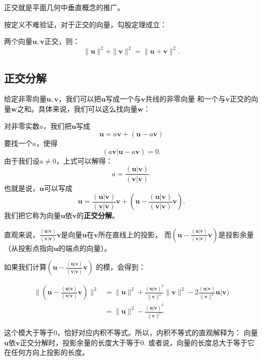 \documentclass[12pt,UTF8,fontset=none]{ctexbook}
\begin{document}
正交就是平面几何中垂直概念的推广。

按定义不难验证，对于正交的向量，勾股定理成立：
\begin{pp}\label{pp:7_2}
    两个向量$\mathbf{u}, \mathbf{v}$正交，则：
    $$ \|\mathbf{u}\|^2 + \|\mathbf{v}\|^2 = \|\mathbf{u} + \mathbf{v}\|^2.$$
\end{pp}

\subsection{正交分解}
给定非零向量$\mathbf{u}, \mathbf{v}$，我们可以把$\mathbf{u}$写成一个与$\mathbf{v}$共线的非零向量
和一个与$\mathbf{v}$正交的向量$\mathbf{w}$之和。具体来说，我们可以这么找向量$\mathbf{w}$：

对非零实数$a$，我们把$\mathbf{u}$写成
$$\mathbf{u} = a\mathbf{v} + (\mathbf{u} - a\mathbf{v}) $$
要找一个$a$，使得
$$ (a\mathbf{v} | \mathbf{u} - a\mathbf{v}) = 0.$$
由于我们设$a \neq 0$，上式可以解得：
$$ a = \frac{(\mathbf{u} | \mathbf{v})}{(\mathbf{v} | \mathbf{v})}.$$
也就是说，$\mathbf{u}$可以写成
$$\mathbf{u} = \frac{(\mathbf{u} | \mathbf{v})}{(\mathbf{v} | \mathbf{v})}\mathbf{v} + \left(\mathbf{u} - \frac{(\mathbf{u} | \mathbf{v})}{(\mathbf{v} | \mathbf{v})}\mathbf{v}\right). $$
我们把它称为向量$\mathbf{u}$依$\mathbf{v}$的\textbf{正交分解}。

直观来说，$\frac{(\mathbf{u} | \mathbf{v})}{(\mathbf{v} | \mathbf{v})}\mathbf{v}$是向量$\mathbf{u}$在$\mathbf{v}$所在直线上的投影，
而$\left(\mathbf{u} - \frac{(\mathbf{u} | \mathbf{v})}{(\mathbf{v} | \mathbf{v})}\mathbf{v}\right)$是投影余量（从投影点指向$\mathbf{u}$的端点的向量）。

如果我们计算$\left(\mathbf{u} - \frac{(\mathbf{u} | \mathbf{v})}{(\mathbf{v} | \mathbf{v})}\mathbf{v}\right)$ 的模，会得到：

\begin{align*}
    \|\left(\mathbf{u} - \frac{(\mathbf{u} | \mathbf{v})}{(\mathbf{v} | \mathbf{v})}\mathbf{v}\right)\|^2 &= 
    \|\mathbf{u}\|^2 + \frac{(\mathbf{u} | \mathbf{v})^2}{\|\mathbf{v} \|^4} \|\mathbf{v} \|^2 - 2 \frac{(\mathbf{u} | \mathbf{v})}{\|\mathbf{v} \|^2} \mathbf{u} | \mathbf{v})  \\
    &= \|\mathbf{u}\|^2 - \frac{(\mathbf{u} | \mathbf{v})^2}{\|\mathbf{v} \|^2}  
\end{align*}

这个模大于等于0，恰好对应内积不等式。所以，内积不等式的直观解释为：
向量$\mathbf{u}$依$\mathbf{v}$正交分解时，投影余量的长度大于等于0. 
或者说，向量的长度总大于等于它在任何方向上投影的长度。
\end{document}
